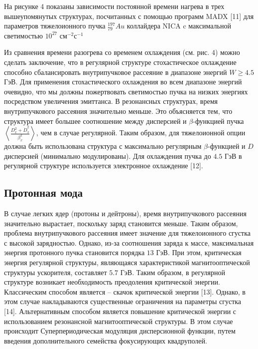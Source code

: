 На рисунке 4 показаны зависимости постоянной времени нагрева в трех вышеупомянутых структурах, посчитанных с помощью программ MADX [11] для параметров тяжелоионного пучка ${_{79}^{197}}Au$ коллайдера NICA c максимальной светимостью ${10}^{27}$ см$^{-2}$с$^{-1}$

Из сравнения времени разогрева со временем охлаждения (см. рис. 4) можно сделать заключение, что в регулярной структуре стохастическое охлаждение способно сбалансировать внутрипучковое рассеяние в диапазоне энергий $W\geq4.5$ ГэВ. Для применения стохастического охлаждения во всем диапазоне энергий очевидно, что мы должны пожертвовать светимостью пучка на низких энергиях посредством увеличения эмиттанса. В резонансных структурах, время внутрипучкового рассеяния значительно меньше. Это объясняется тем, что структура имеет большее соотношение между дисперсией и $\beta$-функцией пучка $\left\langle\frac{D_x^2+{\dot{D}}_x^2}{\beta_x^2}\right\rangle$, чем в случае регулярной. Таким образом, для тяжелоионной опции должна быть использована структура с максимально регулярным $\beta$-функцией и $D$ дисперсией (минимально модулированы). Для охлаждения пучка до $4.5$ ГэВ в регулярной структуре используется электронное охлаждение [12].

\subsection{Протонная мода}

В случае легких ядер (протоны и дейтроны), время внутрипучкового рассеяния значительно вырастает, поскольку заряд становится меньше. Таким образом, проблема внутрипучкового рассеяния имеет значение для тяжелоионного сгустка с высокой зарядностью.
Однако, из-за соотношения заряда к массе, максимальная энергия протонного пучка становится порядка $13$ ГэВ. При этом, критическая энергия регулярной структуры, являющаяся характеристикой магнитооптической структуры ускорителя, составляет $5.7$ ГэВ. Таким образом, в регулярной структуре возникает необходимость преодоления критической энергии. Классическим способом является – скачок критической энергии [13]. Однако, в этом случае накладываются существенные ограничения на параметры сгустка [14]. Альтернативным способом является повышение критической энергии с использованием резонансной магнитооптической структуры. В этом случае происходит Суперпериодическая модуляция дисперсионной функции, путем введения дополнительного семейства фокусирующих квадруполей.



